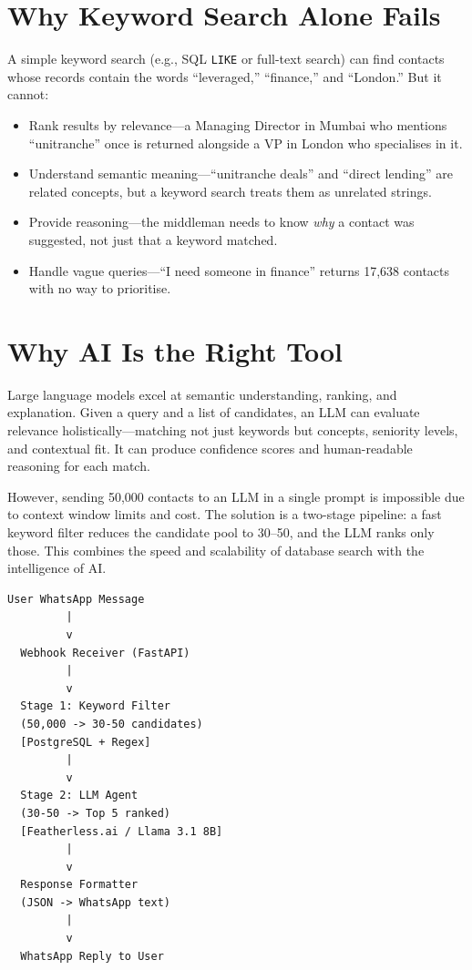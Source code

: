 \documentclass[12pt, a4paper]{report}
\begin{document}
\section{Why Keyword Search Alone Fails}

A simple keyword search (e.g., SQL \texttt{LIKE} or full-text search) can find contacts whose records contain the words ``leveraged,'' ``finance,'' and ``London.'' But it cannot:

\begin{itemize}[itemsep=4pt]
    \item Rank results by relevance---a Managing Director in Mumbai who mentions ``unitranche'' once is returned alongside a VP in London who specialises in it.
    \item Understand semantic meaning---``unitranche deals'' and ``direct lending'' are related concepts, but a keyword search treats them as unrelated strings.
    \item Provide reasoning---the middleman needs to know \emph{why} a contact was suggested, not just that a keyword matched.
    \item Handle vague queries---``I need someone in finance'' returns 17,638 contacts with no way to prioritise.
\end{itemize}

\section{Why AI Is the Right Tool}

Large language models excel at semantic understanding, ranking, and explanation. Given a query and a list of candidates, an LLM can evaluate relevance holistically---matching not just keywords but concepts, seniority levels, and contextual fit. It can produce confidence scores and human-readable reasoning for each match.

However, sending 50,000 contacts to an LLM in a single prompt is impossible due to context window limits and cost. The solution is a two-stage pipeline: a fast keyword filter reduces the candidate pool to 30--50, and the LLM ranks only those. This combines the speed and scalability of database search with the intelligence of AI.

\begin{verbatim}
User WhatsApp Message
         |
         v
  Webhook Receiver (FastAPI)
         |
         v
  Stage 1: Keyword Filter
  (50,000 -> 30-50 candidates)
  [PostgreSQL + Regex]
         |
         v
  Stage 2: LLM Agent
  (30-50 -> Top 5 ranked)
  [Featherless.ai / Llama 3.1 8B]
         |
         v
  Response Formatter
  (JSON -> WhatsApp text)
         |
         v
  WhatsApp Reply to User
\end{verbatim}
\end{document}
